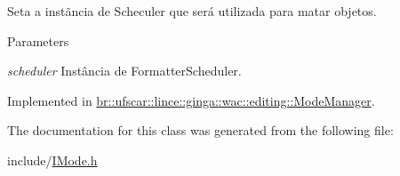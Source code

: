 Seta a instãncia de Scheculer que será utilizada para matar objetos. 


\begin{DoxyParams}{Parameters}
\item[{\em scheduler}]Instância de FormatterScheduler. \end{DoxyParams}


Implemented in \hyperlink{classbr_1_1ufscar_1_1lince_1_1ginga_1_1wac_1_1editing_1_1ModeManager_ac73004e6c04b17ce1673e1fc2a179561}{br::ufscar::lince::ginga::wac::editing::ModeManager}.



The documentation for this class was generated from the following file:\begin{DoxyCompactItemize}
\item 
include/\hyperlink{IMode_8h}{IMode.h}\end{DoxyCompactItemize}

